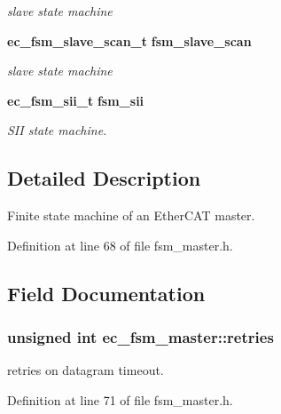 \begin{DoxyCompactItemize}
\begin{DoxyCompactList}\small\item\em slave state machine \end{DoxyCompactList}\item 
{\bf ec\-\_\-fsm\-\_\-slave\-\_\-scan\-\_\-t} {\bf fsm\-\_\-slave\-\_\-scan}\label{structec__fsm__master_aeac9947df44bf439f0e1f2b1c1b7b33f}

\begin{DoxyCompactList}\small\item\em slave state machine \end{DoxyCompactList}\item 
{\bf ec\-\_\-fsm\-\_\-sii\-\_\-t} {\bf fsm\-\_\-sii}\label{structec__fsm__master_aeac629d016ca18930554d88646b1516f}

\begin{DoxyCompactList}\small\item\em S\-I\-I state machine. \end{DoxyCompactList}\end{DoxyCompactItemize}


\subsection{Detailed Description}
Finite state machine of an Ether\-C\-A\-T master. 

Definition at line 68 of file fsm\-\_\-master.\-h.



\subsection{Field Documentation}
\subsubsection[{retries}]{\setlength{\rightskip}{0pt plus 5cm}unsigned int ec\-\_\-fsm\-\_\-master\-::retries}\label{structec__fsm__master_a6dea4cfd065a817b358441748378bd14}


retries on datagram timeout. 



Definition at line 71 of file fsm\-\_\-master.\-h.

